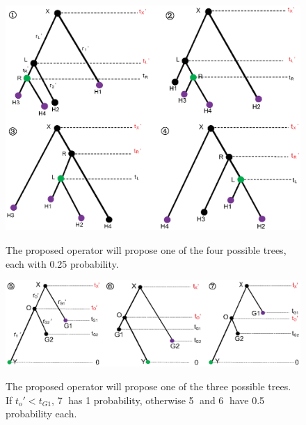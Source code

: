 \documentclass{bmcart}
\begin{document}
\begin{backmatter}
\begin{figure}[h!]
\includegraphics[width=12cm]{Fig06-symmetric.eps}\\
\caption{
             The proposed operator will propose one of the four possible trees, each with 0.25 probability.}
\label{symmetric}
\end{figure}

\begin{figure}[h!]
\includegraphics[width=12cm]{Fig07-asymmetric.eps}\\
\caption{
             The proposed operator will propose one of the three possible trees. If ${t_o}' < t_{G1}$, \textcircled7 has 1 probability, otherwise \textcircled5 and \textcircled6 have 0.5 probability each.}
\label{asymmetric}
\end{figure}


\end{backmatter}
\end{document}
